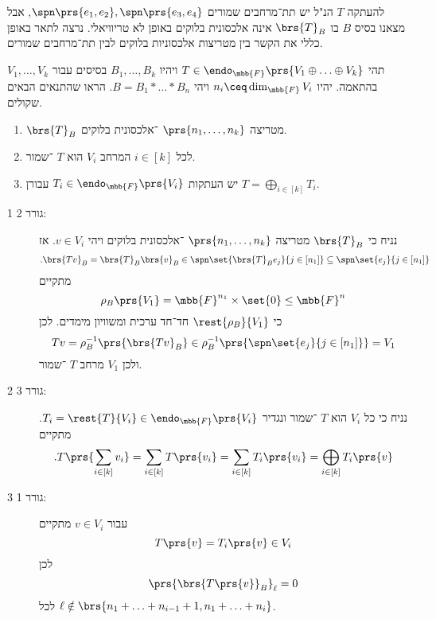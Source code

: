 \documentclass[a4paper,10pt,oneside,openany]{article}
\begin{document}
להעתקה
$T$
הנ"ל יש תת־מרחבים שמורים
$\spn\prs{e_1, e_2}, \spn\prs{e_3, e_4}$,
אבל מצאנו בסיס
$B$
בו
$\brs{T}_B$
אינה אלכסונית בלוקים באופן לא טריוויאלי.
נרצה לתאר באופן כללי את הקשר בין מטריצות אלכסוניות בלוקים לבין תת־מרחבים שמורים.

\begin{exercise}
תהי
$T \in \endo_{\mbb{F}}\prs{V_1 \oplus \ldots \oplus V_k}$
ויהיו
$B_1, \ldots, B_k$
בסיסים עבור
$V_1, \ldots, V_k$
בהתאמה.
יהיו
$n_i \ceq \dim_{\mbb{F}} V_i$
ויהי
$B = B_1 * \ldots * B_n$.
הראו שהתנאים הבאים שקולים.
\begin{enumerate}
\item $\brs{T}_B$
מטריצה
$\prs{n_1, \ldots, n_k}$%
־אלכסונית בלוקים.

\item לכל
$i \in [k]$
המרחב
$V_i$
הוא
$T$%
־שמור.

\item יש העתקות
$T_i \in \endo_{\mbb{F}}\prs{V_i}$
עבורן
$T = \bigoplus_{i \in [k]} T_i$.
\end{enumerate}
\end{exercise}

\begin{solution}
\begin{description}
\item[1 גורר 2:]
נניח כי
$\brs{T}_B$
מטריצה
$\prs{n_1, \ldots, n_k}$%
־אלכסונית בלוקים ויהי
$v \in V_i$.
אז
\begin{align*}
\text{.} \brs{T v}_B &= \brs{T}_B \brs{v}_B \in \spn\set{\brs{T}_B e_j}{j \in [n_1]} \subseteq \spn\set{e_j}{j \in [n_1]}
\end{align*}
מתקיים
\[\rho_B\prs{V_1} = \mbb{F}^{n_1} \times \set{0} \leq \mbb{F}^n\]
כי $\rest{\rho_B}{V_1}$ חד־חד ערכית ומשוויון מימדים.
לכן
\[Tv = \rho_B^{-1}\prs{\brs{Tv}_B} \in \rho_B^{-1}\prs{\spn\set{e_j}{j \in [n_1]}} = V_1\]
ולכן
$V_1$
מרחב
$T$%
־שמור.

\item[2 גורר 3:]
נניח כי כל
$V_i$
הוא
$T$%
־שמור ונגדיר
$T_i = \rest{T}{V_i} \in \endo_{\mbb{F}}\prs{V_i}$.
מתקיים
\[\text{.} T\prs{\sum_{i \in [k]} v_i} = \sum_{i \in [k]} T\prs{v_i} = \sum_{i \in [k]} T_i\prs{v_i} = \bigoplus_{i \in [k]} T_i\prs{v}\]

\item[3 גורר 1:]
עבור
$v \in V_i$
מתקיים
\[T\prs{v} = T_i\prs{v} \in V_i\]
לכן
\[\prs{\brs{T\prs{v}}_B}_{\ell} = 0\]
לכל
$\ell \notin \brs{n_1 + \ldots + n_{i-1} + 1, n_1 + \ldots + n_i}$.
\end{description}
\end{solution}
\end{document}

